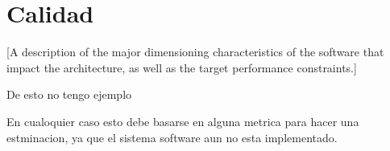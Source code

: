 \chapter{Calidad}

[A description of the major dimensioning characteristics of the software that impact the architecture, as well as the target performance constraints.]

De esto no tengo ejemplo

En cualoquier caso esto debe basarse en alguna metrica para hacer una estminacion, ya que el sistema software aun no esta implementado.

